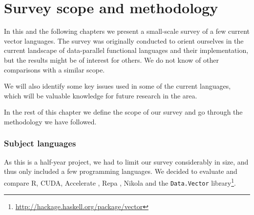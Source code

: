 \chapter{Survey scope and methodology}
\label{cha:survey-setup}

%
%
%

In this and the following chapters we present a small-scale survey of
a few current vector languages. The survey was originally conducted to
orient ourselves in the current landscape of data-parallel functional
languages and their implementation, but the results might be of
interest for others. We do not know of other comparisons with a
similar scope.

We will also identify some key issues used in some of the current
languages, which will be valuable knowledge for future research in the
area.

In the rest of this chapter we define the scope of our survey and go
through the methodology we have followed.

\subsection{Subject languages}
%
%
%
%
%
%
As this is a half-year project, we had to limit our survey
considerably in size, and thus only included a few programming
languages. We decided to evaluate and compare R, CUDA, Accelerate
\cite{chakravarty2011accelerating}, Repa \cite{keller2010regular},
Nikola \cite{mainland2010nikola} and the \texttt{Data.Vector}
library\footnote{\url{http://hackage.haskell.org/package/vector}}. 

